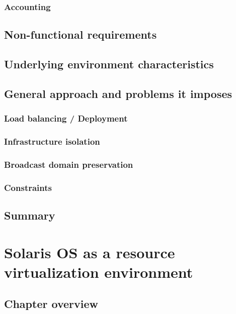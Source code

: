 \documentclass[11pt]{book}
\begin{document}
      \subsection{Accounting}


    \section{Non-functional requirements}

    \section{Underlying environment characteristics}

    \section{General approach and problems it imposes}

      \subsection{Load balancing / Deployment}

      \subsection{Infrastructure isolation}

      \subsection{Broadcast domain preservation}

      \subsection{Constraints}


    \section{Summary}


  \chapter{Solaris OS as a resource virtualization environment}

    \section{Chapter overview}
\end{document}
